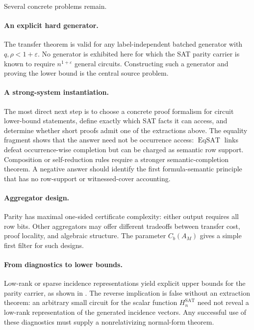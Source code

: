 \documentclass[11pt]{article}
\theoremstyle{definition}
\newcommand{\SAT}{\mathrm{SAT}}
\newcommand{\eps}{\varepsilon}
\newcommand{\EqSAT}{\operatorname{EqSAT}}
\begin{document}
Several concrete problems remain.

\paragraph{An explicit hard generator.}
The transfer theorem is valid for any label-independent batched generator with $q,\rho<1+\eps$. No generator is exhibited here for which the SAT parity carrier is known to require $n^{1+\eps}$ general circuits. Constructing such a generator and proving the lower bound is the central source problem.

\paragraph{A strong-system instantiation.}
The most direct next step is to choose a concrete proof formalism for circuit lower-bound statements, define exactly which SAT facts it can access, and determine whether short proofs admit one of the extractions above. The equality fragment shows that the answer need not be occurrence access: $\EqSAT$ links defeat occurrence-wise completion but can be charged as semantic row support. Composition or self-reduction rules require a stronger semantic-completion theorem. A negative answer should identify the first formula-semantic principle that has no row-support or witnessed-cover accounting.

\paragraph{Aggregator design.}
Parity has maximal one-sided certificate complexity: either output requires all row bits. Other aggregators may offer different tradeoffs between transfer cost, proof locality, and algebraic structure. The parameter $C_b(A_M)$ gives a simple first filter for such designs.

\paragraph{From diagnostics to lower bounds.}
Low-rank or sparse incidence representations yield explicit upper bounds for the parity carrier, as shown in . The reverse implication is false without an extraction theorem: an arbitrary small circuit for the scalar function $H_n^{\SAT}$ need not reveal a low-rank representation of the generated incidence vectors. Any successful use of these diagnostics must supply a nonrelativizing normal-form theorem.
\end{document}
